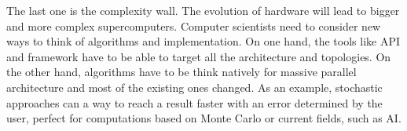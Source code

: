 The last one is the complexity wall.
The evolution of hardware will lead to bigger and more complex supercomputers. 
Computer scientists need to consider new ways to think of algorithms and implementation. 
On one hand, the tools like API and framework have to be able to target all the architecture and topologies.
On the other hand, algorithms have to be think natively for massive parallel architecture and most of the existing ones changed.
As an example, stochastic approaches can a way to reach a result faster with an error determined by the user, perfect for computations based on Monte Carlo or current fields, such as AI.
